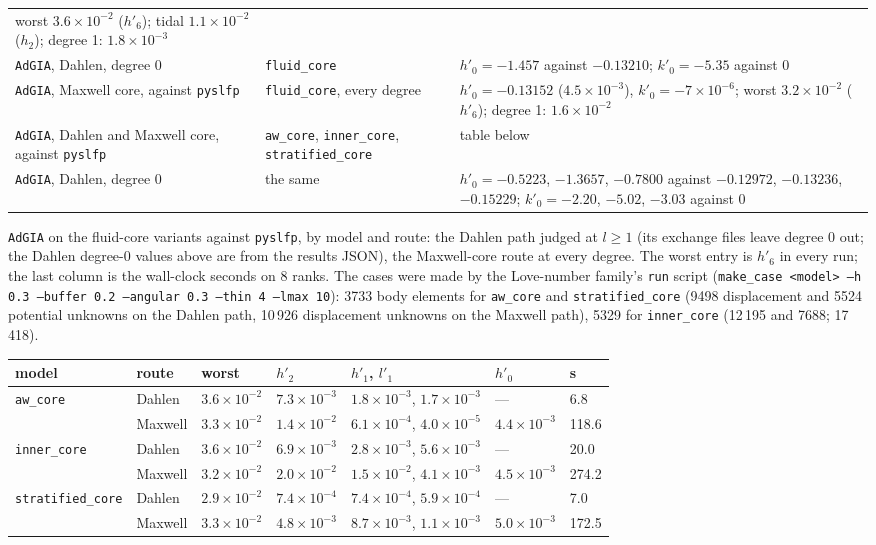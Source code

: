 \documentclass[11pt]{article}
\numberwithin{equation}{section}
\newcommand{\code}[1]{\texttt{#1}}
\begin{document}
\begin{center}
\begin{tabular}{@{}P{3.9cm}P{4.4cm}P{6.9cm}@{}}
worst $3.6\times10^{-2}$ ($h'_6$); tidal $1.1\times10^{-2}$ ($h_2$);
degree 1: $1.8\times10^{-3}$ \\ \addlinespace
\code{AdGIA}, Dahlen, degree 0 & \code{fluid\_core} & $h'_0=-1.457$ against
$-0.13210$; $k'_0=-5.35$ against 0 \\ \addlinespace
\code{AdGIA}, Maxwell core, against \code{pyslfp} & \code{fluid\_core}, every
degree & $h'_0=-0.13152$ ($4.5\times10^{-3}$), $k'_0=-7\times10^{-6}$;
worst $3.2\times10^{-2}$ ($h'_6$); degree 1: $1.6\times10^{-2}$ \\
\addlinespace
\code{AdGIA}, Dahlen and Maxwell core, against \code{pyslfp} &
\code{aw\_core}, \code{inner\_core}, \code{stratified\_core} & table below
\\ \addlinespace
\code{AdGIA}, Dahlen, degree 0 & the same & $h'_0=-0.5223$, $-1.3657$,
$-0.7800$ against $-0.12972$, $-0.13236$, $-0.15229$; $k'_0=-2.20$,
$-5.02$, $-3.03$ against 0 \\
\bottomrule
\end{tabular}
\end{center}
\noindent \code{AdGIA} on the fluid-core variants against \code{pyslfp}, by
model and route: the Dahlen path judged at $l\ge1$ (its exchange files
leave degree 0 out; the Dahlen degree-0 values above are from the results
JSON), the Maxwell-core route at every degree. The worst entry is $h'_6$ in every run; the last column is
the wall-clock seconds on 8 ranks. The cases were made by the Love-number
family's \code{run} script (\code{make\_case <model> --h 0.3 --buffer 0.2
--angular 0.3 --thin 4 --lmax 10}): 3733 body elements for \code{aw\_core}
and \code{stratified\_core} (9498 displacement and 5524 potential unknowns
on the Dahlen path, 10\,926 displacement unknowns on the Maxwell path), 5329
for \code{inner\_core} (12\,195 and 7688; 17\,418).
\begin{center}
\small
\begin{tabular}{@{}lllllll@{}}
\toprule
model & route & worst & $h'_2$ & $h'_1$, $l'_1$ & $h'_0$ & s \\
\midrule
\code{aw\_core} & Dahlen & $3.6\times10^{-2}$ & $7.3\times10^{-3}$ &
$1.8\times10^{-3}$, $1.7\times10^{-3}$ & --- & 6.8 \\
& Maxwell & $3.3\times10^{-2}$ & $1.4\times10^{-2}$ &
$6.1\times10^{-4}$, $4.0\times10^{-5}$ & $4.4\times10^{-3}$ & 118.6 \\
\addlinespace
\code{inner\_core} & Dahlen & $3.6\times10^{-2}$ & $6.9\times10^{-3}$ &
$2.8\times10^{-3}$, $5.6\times10^{-3}$ & --- & 20.0 \\
& Maxwell & $3.2\times10^{-2}$ & $2.0\times10^{-2}$ &
$1.5\times10^{-2}$, $4.1\times10^{-3}$ & $4.5\times10^{-3}$ & 274.2 \\
\addlinespace
\code{stratified\_core} & Dahlen & $2.9\times10^{-2}$ & $7.4\times10^{-4}$ &
$7.4\times10^{-4}$, $5.9\times10^{-4}$ & --- & 7.0 \\
& Maxwell & $3.3\times10^{-2}$ & $4.8\times10^{-3}$ &
$8.7\times10^{-3}$, $1.1\times10^{-3}$ & $5.0\times10^{-3}$ & 172.5 \\
\bottomrule
\end{tabular}
\end{center}
\end{document}
